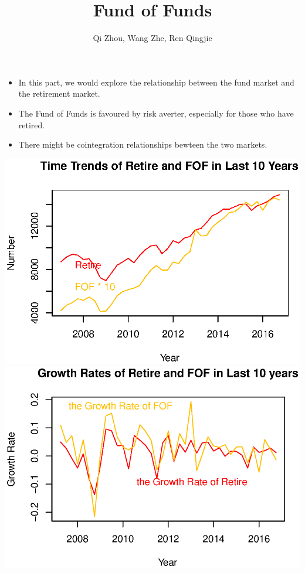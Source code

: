\documentclass[xcolor=dvipsnames]{beamer}
\title[FOF]{Fund of Funds}
\author{Qi Zhou, Wang Zhe, Ren Qingjie}
\institute{School of Physics \& School of Economics, Peking University}
\begin{document}
\maketitle



\begin{frame}
	\begin{itemize}
		\item{In this part, we would explore the relationship between the fund market and the retirement market.}
		\item{The Fund of Funds is favoured by risk averter, especially for those who have retired.}
		\item{There might be cointegration relationships bewteen the two markets.}
	\end{itemize}
	\includegraphics[scale=0.4]{3-1.eps}
	\includegraphics[scale=0.4]{3-2.eps}
\end{frame}
\end{document}
